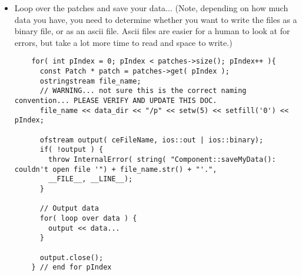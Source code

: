 \documentclass[11pt,fleqn]{book} %
\begin{document}
\begin{itemize}
\item Loop over the patches and save your data... (Note, depending on
  how much data you have, you need to determine whether you want to
  write the files as a binary file, or as an ascii file.  Ascii files
  are easier for a human to look at for errors, but take a lot more
  time to read and space to write.)

  \begin{lstlisting}
    for( int pIndex = 0; pIndex < patches->size(); pIndex++ ){
      const Patch * patch = patches->get( pIndex );
      ostringstream file_name;
      // WARNING... not sure this is the correct naming convention... PLEASE VERIFY AND UPDATE THIS DOC.
      file_name << data_dir << "/p" << setw(5) << setfill('0') << pIndex;

      ofstream output( ceFileName, ios::out | ios::binary);
      if( !output ) {
        throw InternalError( string( "Component::saveMyData(): couldn't open file '") + file_name.str() + "'.",
        __FILE__, __LINE__);        
      }

      // Output data
      for( loop over data ) {
        output << data...
      }

      output.close();
    } // end for pIndex
  \end{lstlisting}

\end{itemize}



\end{document}
